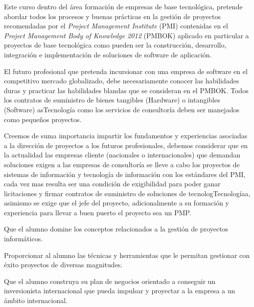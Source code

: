 \begin{syllabus}


\begin{justification}
Este curso dentro del área formación de empresas de base tecnológica, 
pretende abordar todos los procesos y buenas prácticas en la 
gestión de proyectos recomendadas por el \textit{Project Management Institute} (PMI) 
contenidas en el \textit{Project Management Body of Knowledge 2012} (PMBOK)  
aplicado en particular a proyectos de base tecnológica como pueden ser la 
construcción, desarrollo, integración e implementación de soluciones de 
software de aplicación.

El futuro profesional que pretenda incursionar con una empresa de 
software en el competitivo mercado globalizado, debe necesariamente 
conocer las habilidades duras y practicar las habilidades blandas que se 
consideran en el PMBOK. Todos los contratos de suministro de bienes 
tangibles (Hardware) o intangibles (Software) asTecnología como los servicios de 
consultoría deben ser manejados como pequeños proyectos.

Creemos de suma importancia impartir los fundamentos y experiencias 
asociadas a la dirección de proyectos a los futuros profesionales, 
debemos considerar que en la actualidad las empresas cliente 
(nacionales o internacionales) que demandan soluciones exigen a 
las empresas de consultoría se lleve a cabo los proyectos de sistemas 
de información y tecnología de información con los estándares del PMI, 
cada vez mas resulta ser una condición de exigibilidad para poder ganar 
licitaciones y firmar contratos de suministro de soluciones de tecnologTecnologíaa, 
asimismo se exige que el jefe del proyecto, adicionalmente a su formación y 
experiencia para llevar a buen puerto el proyecto sea un PMP.
\end{justification}

\begin{goals}
\item Que el alumno domine los conceptos relacionados a la gestión de proyectos informáticos.
\item Proporcionar al alumno las técnicas y herramientas que le permitan gestionar con éxito proyectos de diversas magnitudes.
\item Que el alumno construya su plan de negocios orientado a conseguir un inversionista internacional que pueda impulsar y proyectar a la empresa a un ámbito internacional.
\end{goals}


\end{syllabus}
